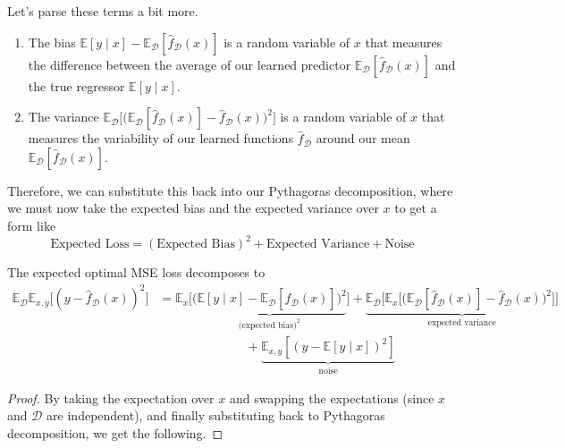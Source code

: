   Let's parse these terms a bit more. 
  \begin{enumerate}
    \item The bias $\mathbb{E}[y \mid x] - \mathbb{E}_{\mathcal{D}} [\hat{f}_\mathcal{D} (x)]$ is a random variable of $x$ that measures the difference between the average of our learned predictor $\mathbb{E}_{\mathcal{D}} [\hat{f}_\mathcal{D} (x)]$ and the true regressor $\mathbb{E}[y \mid x]$. 

    \item The variance $\mathbb{E}_\mathcal{D} \big[ \big( \mathbb{E}_\mathcal{D} [\hat{f}_\mathcal{D} (x)] - \hat{f}_\mathcal{D} (x) \big)^2 \big]$ is a random variable of $x$ that measures the variability of our learned functions $\hat{f}_{\mathcal{D}}$ around our mean $\mathbb{E}_\mathcal{D} [\hat{f}_\mathcal{D} (x)]$. 
  \end{enumerate}

  Therefore, we can substitute this back into our Pythagoras decomposition, where we must now take the expected bias and the expected variance over $x$ to get a form like 
  \begin{equation}
    \text{Expected Loss} = (\text{Expected Bias})^2 + \text{Expected Variance} + \text{Noise}
  \end{equation}

  \begin{corollary}
    The expected optimal MSE loss decomposes to 
    \begin{align}
      \mathbb{E}_{\mathcal{D}} \mathbb{E}_{x, y} \big[ (y - \hat{f}_{\mathcal{D}}(x))^2 \big] 
      & = \mathbb{E}_{x} \big[ \underbrace{ \big( \mathbb{E}[y \mid x] - \mathbb{E}_{\mathcal{D}} [\hat{f}_\mathcal{D} (x)] \big)^2}_{\text{(expected bias)}^2} \big] + \underbrace{ \mathbb{E}_\mathcal{D} \big[ \mathbb{E}_{x} \big[ \big( \mathbb{E}_\mathcal{D} [\hat{f}_\mathcal{D} (x)] - \hat{f}_\mathcal{D} (x) \big)^2 \big] \big]}_{\text{expected variance}} \\ 
      & \;\;\;\;\;\;\;\;\;\;\;\;\;\;\;\;\;\;\;\;\;\;\;\;\; + \underbrace{\mathbb{E}_{x, y} [(y - \mathbb{E}[y \mid x])^2]}_{\text{noise}}
    \end{align}
  \end{corollary}
  \begin{proof}
    By taking the expectation over $x$ and swapping the expectations (since $x$ and $\mathcal{D}$ are independent), and finally substituting back to Pythagoras decomposition, we get the following. 
  \end{proof}


